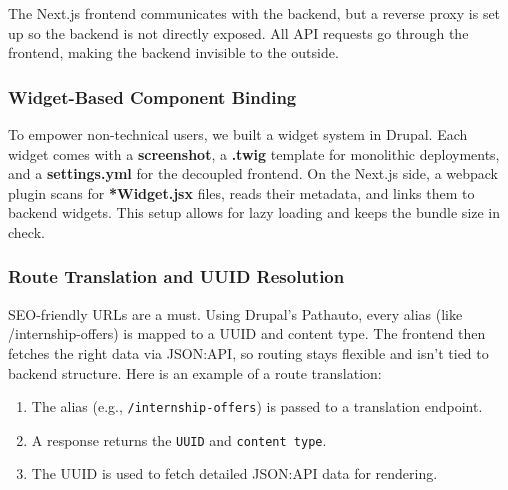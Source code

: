 The Next.js frontend communicates with the backend, but a reverse proxy is set up so the backend is not directly exposed. All API requests go through the frontend, making the backend invisible to the outside.



\subsubsection{Widget-Based Component Binding}

To empower non-technical users, we built a widget system in Drupal. Each widget comes with a \textbf{screenshot}, a \textbf{.twig} template for monolithic deployments, and a \textbf{settings.yml} for the decoupled frontend. On the Next.js side, a webpack plugin scans for \textbf{*Widget.jsx} files, reads their metadata, and links them to backend widgets. This setup allows for lazy loading and keeps the bundle size in check.

\subsubsection{Route Translation and UUID Resolution}

SEO-friendly URLs are a must. Using Drupal's Pathauto, every alias (like /internship-offers) is mapped to a UUID and content type. The frontend then fetches the right data via JSON:API, so routing stays flexible and isn't tied to backend structure.
Here is an example of a route translation:
\begin{enumerate}
  \item The alias (e.g., \texttt{/internship-offers}) is passed to a translation endpoint.
  \item A response returns the \texttt{UUID} and \texttt{content type}.
  \item The UUID is used to fetch detailed JSON:API data for rendering.
\end{enumerate}

